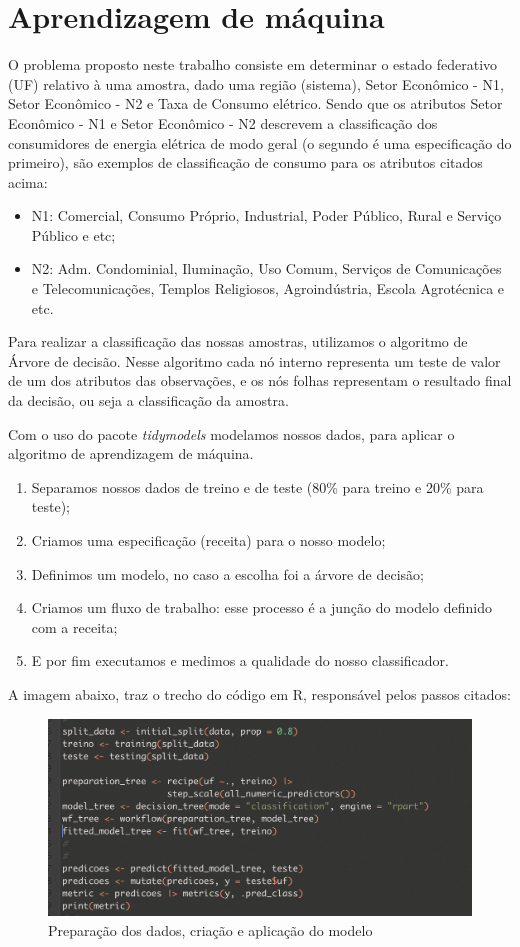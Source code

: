 \documentclass[12pt]{article}
\begin{document}
\section{Aprendizagem de máquina}
O problema proposto neste trabalho consiste em determinar o estado federativo (UF) relativo à uma amostra, dado uma região (sistema), Setor Econômico - N1, Setor Econômico - N2 e Taxa de Consumo elétrico. Sendo que os atributos Setor Econômico - N1 e Setor Econômico - N2 descrevem a classificação dos consumidores de energia elétrica de modo geral (o segundo é uma especificação do primeiro), são exemplos de classificação de consumo para os atributos citados acima:
\begin{itemize}
    \item N1: Comercial, Consumo Próprio, Industrial, Poder Público, Rural e Serviço Público e etc;
    \item N2: Adm. Condominial, Iluminação, Uso Comum, Serviços de Comunicações e Telecomunicações, Templos Religiosos, Agroindústria, Escola Agrotécnica e etc.
\end{itemize}

Para realizar a classificação das nossas amostras, utilizamos o algoritmo de Árvore de decisão. Nesse algoritmo cada nó interno representa um teste de valor de um dos atributos das observações, e os nós folhas representam o resultado final da decisão, ou seja a classificação da amostra.

Com o uso do pacote \textit{tidymodels} modelamos nossos dados, para aplicar o algoritmo de aprendizagem de máquina.
\begin{enumerate}
    \item Separamos nossos dados de treino e de teste (80\% para treino e 20\% para teste);
    \item Criamos uma especificação (receita) para o nosso modelo;
    \item Definimos um modelo, no caso a escolha foi a árvore de decisão;
    \item Criamos um fluxo de trabalho: esse processo é a junção do modelo definido com a receita;
    \item E por fim executamos e medimos a qualidade do nosso classificador.
\end{enumerate}
A imagem abaixo, traz o trecho do código em R, responsável pelos passos citados:

\begin{figure}[!h]
\centering
\includegraphics[width=1\textwidth]{images/tidymodels.png}
\caption{Preparação dos dados, criação e aplicação do modelo}
\label{fig:exampleFig1}
\end{figure}
\end{document}

